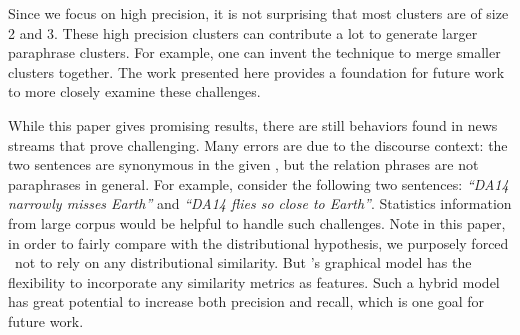 Since we focus on high precision, it is not surprising that most clusters are of
size 2 and 3. These high precision clusters can contribute a lot to generate
larger paraphrase clusters. For example, one can invent the technique to merge
smaller clusters together.  The work presented here provides a foundation for
future work to more closely examine these challenges.

While this paper gives promising results, there are still behaviors
found in news streams that prove challenging. Many errors are due to the
discourse context: the two sentences are synonymous in the given \bag , but the
relation phrases are not paraphrases in general. For example, consider the
following two sentences: {\em ``DA14 narrowly misses Earth''} and {\em ``DA14
flies so close to Earth''}. Statistics information from large corpus would be
helpful to handle such challenges. Note in this paper, in order to fairly
compare with the distributional hypothesis, we purposely forced \sys\ not to rely on any
distributional similarity. But \sys's graphical model has the flexibility to
incorporate any similarity metrics as features. Such a hybrid model has great
potential to increase both precision and recall, which is one goal for future
work.

 